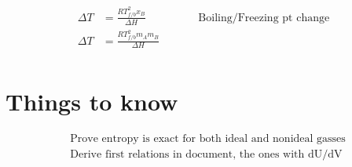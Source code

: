 \documentclass[10pt]{article} %
\begin{document}
\begin{align*}
  \Delta T &= \frac{RT^2_{f/b}x_B}{\Delta H}\hspace{2cm}\mbox{Boiling/Freezing pt change}\\
  \Delta T &= \frac{RT^2_{f/b}m_Am_B}{\Delta H}\\
\end{align*}

\section{Things to know}
\begin{align*}
  &\mbox{Prove entropy is exact for both ideal and nonideal gasses}\\
  &\mbox{Derive first relations in document, the ones with dU/dV}\\
\end{align*}
\end{document}
